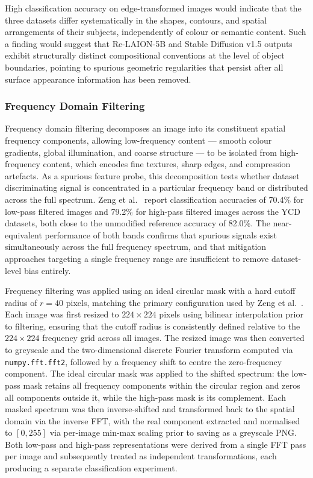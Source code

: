 High classification accuracy on edge-transformed images would indicate that 
the three datasets differ systematically in the shapes, contours, and spatial 
arrangements of their subjects, independently of colour or semantic content. 
Such a finding would suggest that Re-LAION-5B and Stable Diffusion v1.5 
outputs exhibit structurally distinct compositional conventions at the level 
of object boundaries, pointing to spurious geometric regularities that persist 
after all surface appearance information has been removed.



\subsubsection{Frequency Domain Filtering}

Frequency domain filtering decomposes an image into its constituent spatial 
frequency components, allowing low-frequency content — smooth colour gradients, 
global illumination, and coarse structure — to be isolated from high-frequency 
content, which encodes fine textures, sharp edges, and compression artefacts. 
As a spurious feature probe, this decomposition tests whether 
dataset discriminating signal is concentrated in a particular frequency band 
or distributed across the full spectrum. Zeng et al.\ 
\cite{Zeng_2024_UnderstandingBiasinLargeScaleVisualDatasets} report 
classification accuracies of 70.4\% for low-pass filtered images and 79.2\% 
for high-pass filtered images across the YCD datasets, both close to the 
unmodified reference accuracy of 82.0\%. The near-equivalent performance of 
both bands confirms that spurious signals exist simultaneously across the full 
frequency spectrum, and that mitigation approaches targeting a single frequency 
range are insufficient to remove dataset-level bias entirely.

Frequency filtering was applied using an ideal circular mask with a hard 
cutoff radius of $r = 40$ pixels, matching the primary configuration used by 
Zeng et al.\ \cite{Zeng_2024_UnderstandingBiasinLargeScaleVisualDatasets}. Each image was first resized to $224 \times 224$ pixels using bilinear interpolation prior to filtering, ensuring that the 
cutoff radius is consistently defined relative to the $224 \times 224$ 
frequency grid across all images. The resized image was then converted to 
greyscale and the two-dimensional discrete Fourier transform computed via 
\texttt{numpy.fft.fft2}, followed by a frequency shift to centre the 
zero-frequency component. The ideal circular mask was applied to the shifted 
spectrum: the low-pass mask retains all frequency components within the 
circular region and zeros all components outside it, while the high-pass mask 
is its complement. Each masked spectrum was then inverse-shifted and transformed back to the spatial 
domain via the inverse FFT, with the real component extracted and normalised 
to $[0, 255]$ via per-image min-max scaling prior to saving as a greyscale 
PNG. Both low-pass and high-pass representations were derived from a single 
FFT pass per image and subsequently treated as independent transformations, 
each producing a separate classification experiment.

